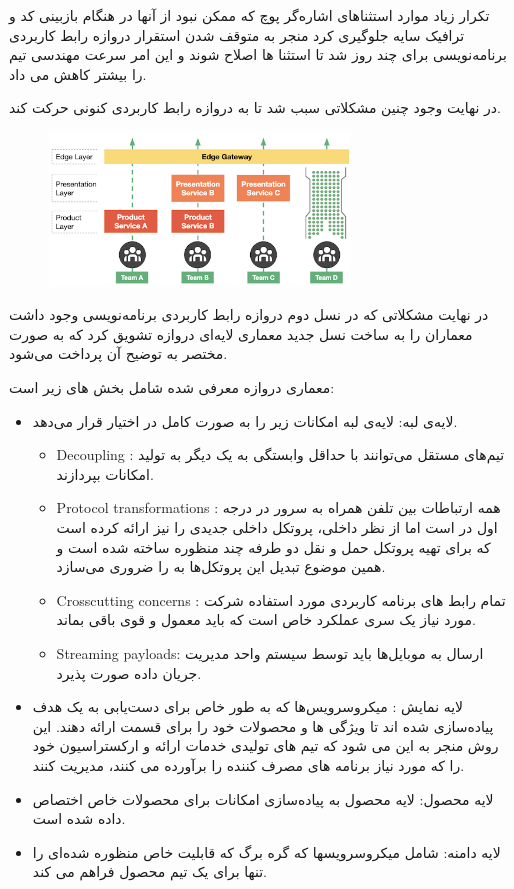تکرار زیاد موارد استثناهای اشاره‌گر پوچ  که ممکن نبود از آنها در هنگام بازبینی کد و ترافیک سایه جلوگیری کرد منجر به متوقف شدن استقرار دروازه رابط کاربردی برنامه‌نویسی برای چند روز شد تا استثنا ها اصلاح شوند و این امر سرعت مهندسی تیم  را بیشتر کاهش می داد.

در نهایت وجود چنین مشکلاتی سبب شد تا  به دروازه رابط کاربردی کنونی حرکت کند.
\begin{figure}[h]
\label{fig:apigateway_gen3}
\centering
\includegraphics[width=8cm]{gen3_apigateway.png}
\end{figure}
در نهایت مشکلاتی که در نسل دوم دروازه رابط کاربردی برنامه‌نویسی وجود داشت معماران را به ساخت نسل جدید معماری لایه‌ای دروازه تشویق کرد که به صورت مختصر به توضیح آن پرداخت می‌شود.

معماری دروازه معرفی شده شامل بخش های زیر است:
\begin{itemize}
\item
لایه‌ی لبه: لایه‌ی لبه امکانات زیر را به صورت کامل در اختیار قرار می‌دهد.
\begin{itemize}
\item
Decoupling :
تیم‌های مستقل می‌توانند با حداقل وابستگی به یک دیگر به تولید امکانات بپردازند.
\item
Protocol transformations :
همه ارتباطات بین تلفن همراه به سرور در درجه اول در  است اما از نظر داخلی،  پروتکل داخلی جدیدی را نیز ارائه کرده است که برای تهیه پروتکل حمل و نقل دو طرفه چند منظوره ساخته شده است و همین موضوع تبدیل این پروتکل‌ها به  را ضروری می‌سازد.
\item
Crosscutting concerns :
تمام رابط های برنامه کاربردی مورد استفاده شرکت مورد نیاز یک سری عملکرد خاص است که باید معمول و قوی باقی بماند.
\item
Streaming payloads:
ارسال  به موبایل‌ها باید توسط سیستم واحد مدیریت جریان داده صورت پذیرد.
\end{itemize}
\item
لایه نمایش :
میکروسرویس‌ها که به طور خاص برای دست‌یابی به یک هدف پیاده‌سازی شده اند تا ویژگی ها و محصولات خود را برای قسمت  ارائه دهند. این روش منجر به این می شود که تیم های تولیدی خدمات ارائه و ارکستراسیون خود را که  مورد نیاز برنامه های مصرف کننده را برآورده می کنند، مدیریت کنند.
\item
لایه محصول:
لایه محصول به پیاده‌سازی امکانات برای محصولات خاص اختصاص داده شده است.
\item
لایه دامنه:
شامل میکروسرویسها که گره برگ که قابلیت خاص منظوره شده‌ای را تنها برای یک تیم محصول فراهم می کند.
\end{itemize}